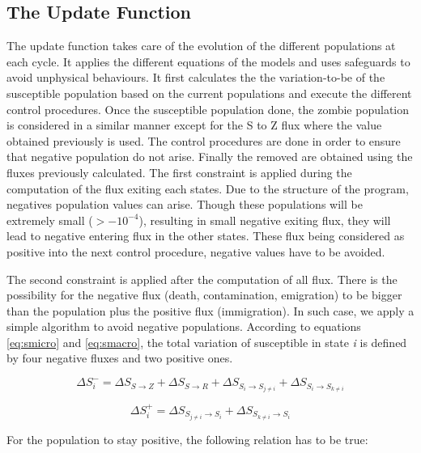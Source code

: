 \documentclass[11pt]{article} %
\begin{document}
\subsection{The Update Function}\indent

The update function takes care of the evolution of the different populations at each cycle. It applies the different equations of the models and uses safeguards to avoid unphysical behaviours. It first calculates the the variation-to-be of the susceptible population based on the current populations and execute the different control procedures. Once the susceptible population done, the zombie population is considered in a similar manner except for the S to Z flux where the value obtained previously is used. The control procedures are done in order to ensure that negative population do not arise. Finally the removed are obtained using the fluxes previously calculated.
The first constraint is applied during the computation of the flux exiting each states. Due to the structure of the program, negatives population values can arise. Though these populations will be extremely small ($> - 10^{-4}$), resulting in small negative exiting flux, they will lead to negative entering flux in the other states. These flux being considered as positive into the next control procedure, negative values have to be avoided.

The second constraint is applied after the computation of all flux. There is the possibility for the negative flux (death, contamination, emigration) to be bigger than the population plus the positive flux (immigration). In such case, we apply a simple algorithm to avoid negative populations. According to equations \eqref{eq:smicro} and \eqref{eq:smacro}, the total variation of susceptible in state \textit{i} is defined by four negative fluxes and two positive ones.

\bigskip
\begin{equation} \label{eq:delta-}
\Delta S_i^- = \Delta S_{S\rightarrow Z} + \Delta S_{S\rightarrow R} + \Delta S_{S_i\rightarrow S_{j\neq i}} + \Delta S_{S_i\rightarrow S_{k\neq i}}
\end{equation}

\begin{equation} \label{eq:delta+}
\Delta S_i^+ = \Delta S_{S_{j\neq i}\rightarrow S_i} + \Delta S_{S_{k\neq i}\rightarrow S_i}
\end{equation}
\bigskip

For the population to stay positive, the following relation has to be true:
\end{document}
